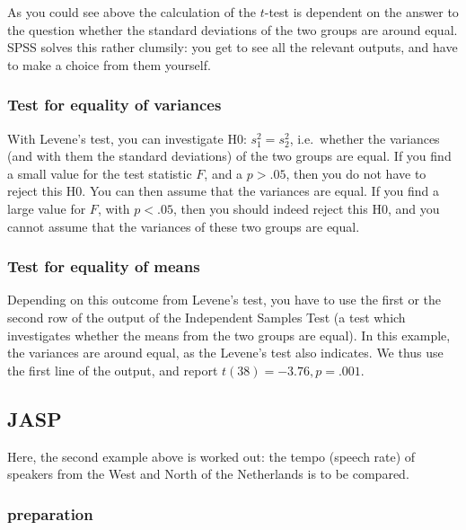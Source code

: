 \documentclass[
]{book}
\begin{document}
As you could see above the calculation of the \(t\)-test is dependent on the
answer to the question whether the standard deviations of the two groups
are around equal. SPSS solves this rather clumsily: you get to see all the
relevant outputs, and have to make a choice from them yourself.

\hypertarget{test-for-equality-of-variances}{%
\subsubsection{Test for equality of variances}\label{test-for-equality-of-variances}}

With Levene's test, you can investigate H0: \(s^2_1 = s^2_2\), i.e.~whether
the variances (and with them the standard deviations) of the two groups
are equal. If you find a small value for the test statistic \(F\),
and a \(p>.05\), then you do not have to reject this H0. You can then assume
that the variances are equal. If you find a large value for \(F\),
with \(p<.05\), then you should indeed reject this H0, and you cannot
assume that the variances of these two groups are equal.

\hypertarget{test-for-equality-of-means}{%
\subsubsection{Test for equality of means}\label{test-for-equality-of-means}}

Depending on this outcome from Levene's test, you have to use the first
or the second row of the output of the Independent Samples Test
(a test which investigates whether the means from the two groups are equal).
In this example, the variances are around equal, as the
Levene's test also indicates. We thus use the first line of the output,
and report \(t(38)=-3.76, p=.001\).

\hypertarget{sec:JASP-ttest-unpaired}{%
\subsection{JASP}\label{sec:JASP-ttest-unpaired}}

Here, the second example above is worked out: the tempo (speech rate) of speakers from the West and North of the Netherlands is to be compared.

\hypertarget{preparation}{%
\subsubsection{preparation}\label{preparation}}
\end{document}
